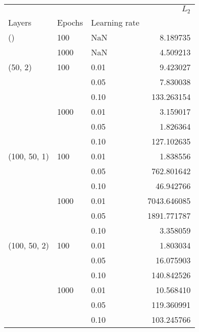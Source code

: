 \begin{tabular}{lllr}
\toprule
             &      &      &        $L_2$ \\
Layers & Epochs & Learning rate &              \\
\midrule
() & 100  & NaN &     8.189735 \\
             & 1000 & NaN &     4.509213 \\
(50, 2) & 100  & 0.01 &     9.423027 \\
             &      & 0.05 &     7.830038 \\
             &      & 0.10 &   133.263154 \\
             & 1000 & 0.01 &     3.159017 \\
             &      & 0.05 &     1.826364 \\
             &      & 0.10 &   127.102635 \\
(100, 50, 1) & 100  & 0.01 &     1.838556 \\
             &      & 0.05 &   762.801642 \\
             &      & 0.10 &    46.942766 \\
             & 1000 & 0.01 &  7043.646085 \\
             &      & 0.05 &  1891.771787 \\
             &      & 0.10 &     3.358059 \\
(100, 50, 2) & 100  & 0.01 &     1.803034 \\
             &      & 0.05 &    16.075903 \\
             &      & 0.10 &   140.842526 \\
             & 1000 & 0.01 &    10.568410 \\
             &      & 0.05 &   119.360991 \\
             &      & 0.10 &   103.245766 \\
\bottomrule
\end{tabular}
